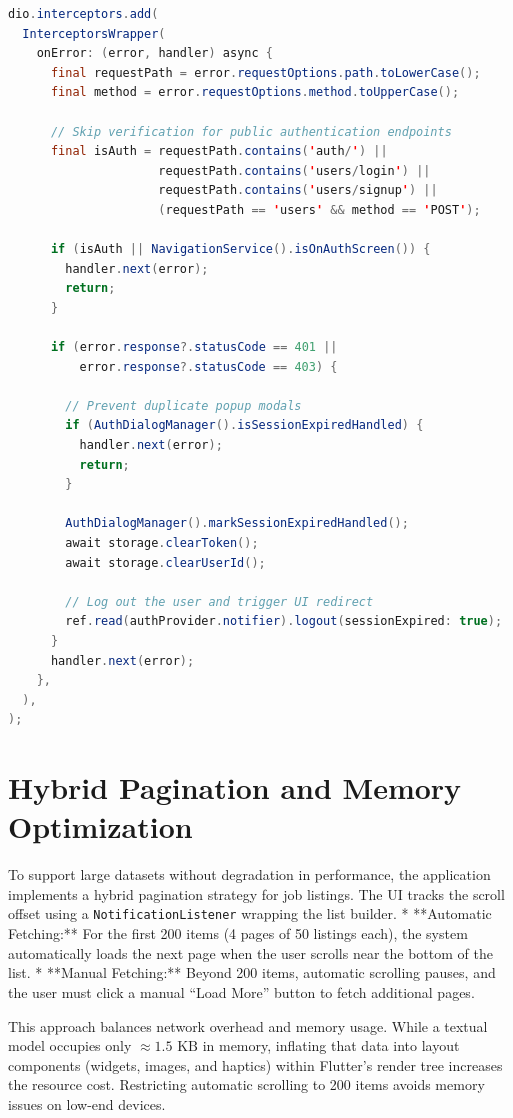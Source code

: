 \begin{lstlisting}[language=Java, caption={Dio Session Expiration Interceptor implementation}, label=lst:interceptor_logic]
dio.interceptors.add(
  InterceptorsWrapper(
    onError: (error, handler) async {
      final requestPath = error.requestOptions.path.toLowerCase();
      final method = error.requestOptions.method.toUpperCase();

      // Skip verification for public authentication endpoints
      final isAuth = requestPath.contains('auth/') ||
                     requestPath.contains('users/login') ||
                     requestPath.contains('users/signup') ||
                     (requestPath == 'users' && method == 'POST');

      if (isAuth || NavigationService().isOnAuthScreen()) {
        handler.next(error);
        return;
      }

      if (error.response?.statusCode == 401 || 
          error.response?.statusCode == 403) {
        
        // Prevent duplicate popup modals
        if (AuthDialogManager().isSessionExpiredHandled) {
          handler.next(error);
          return;
        }

        AuthDialogManager().markSessionExpiredHandled();
        await storage.clearToken();
        await storage.clearUserId();
        
        // Log out the user and trigger UI redirect
        ref.read(authProvider.notifier).logout(sessionExpired: true);
      }
      handler.next(error);
    },
  ),
);
\end{lstlisting}

\section{Hybrid Pagination and Memory Optimization}
To support large datasets without degradation in performance, the application implements a hybrid pagination strategy for job listings.
The UI tracks the scroll offset using a \texttt{NotificationListener} wrapping the list builder.
* **Automatic Fetching:** For the first 200 items (4 pages of 50 listings each), the system automatically loads the next page when the user scrolls near the bottom of the list.
* **Manual Fetching:** Beyond 200 items, automatic scrolling pauses, and the user must click a manual ``Load More'' button to fetch additional pages.

This approach balances network overhead and memory usage. While a textual model occupies only $\approx 1.5\text{ KB}$ in memory, inflating that data into layout components (widgets, images, and haptics) within Flutter's render tree increases the resource cost. Restricting automatic scrolling to 200 items avoids memory issues on low-end devices.

